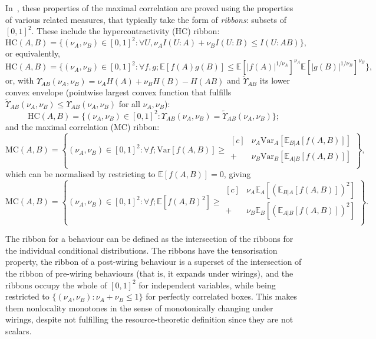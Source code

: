 \documentclass[10pt, a4paper]{article}
\numberwithin{equation}{section} %
\theoremstyle{definition}
\theoremstyle{plain}
\newcommand{\abs}[1]{\left\lvert#1\right\rvert}
\newcommand{\st}{\mathrel{:}} %
\newcommand{\?}{\mathrel{?}} %
\newcommand{\E}{\mathbb{E}} %
\newcommand{\Var}{\mathrm{Var}} %
\newcommand{\HC}{\mathrm{HC}}
\newcommand{\MC}{\mathrm{MC}}
\begin{document}
    In~\cite{NLMonotones}, these properties of the maximal correlation are proved using the properties of various related measures, that typically take the form of \emph{ribbons}: subsets of \({[0,1]}^2\). These include the hypercontractivity (HC) ribbon:
    \begin{equation}
      \HC(A,B) = \{(\nu_A, \nu_B) \in {[0,1]}^2 \st \forall U, \nu_A I(U:A) + \nu_B I(U:B) \leq I(U:AB)\},
    \end{equation}
    or equivalently,
    \begin{equation}
      \HC(A,B) = \{(\nu_A, \nu_B) \in {[0,1]}^2 \st \forall f,g; \E[f(A)g(B)] \leq {\E[\abs{f(A)}^{1/\nu_A}]}^{\nu_A} {\E[\abs{g(B)}^{1/\nu_B}]}^{\nu_B} \},
    \end{equation}
    or, with \(\Upsilon_{AB}(\nu_A, \nu_B) = \nu_A H(A) + \nu_B H(B) - H(AB)\) and \(\tilde{\Upsilon}_{AB}\) its lower convex envelope (pointwise largest convex function that fulfills \(\tilde{\Upsilon}_{AB}(\nu_A, \nu_B) \leq \Upsilon_{AB}(\nu_A, \nu_B)\) for all \(\nu_A, \nu_B\)):
    \begin{equation}
      \HC(A,B) = \{(\nu_A, \nu_B) \in {[0,1]}^2 \st \Upsilon_{AB}(\nu_A, \nu_B) = \tilde{\Upsilon}_{AB}(\nu_A, \nu_B) \};
    \end{equation}
    and the maximal correlation (MC) ribbon:
    \begin{equation}
      \MC(A,B) = \left\{ 
        (\nu_A, \nu_B) \in {[0,1]}^2 \st \forall f; \Var[f(A,B)] \geq 
        \begin{aligned}[c]
          & \nu_A \Var_A[\E_{B|A}[f(A,B)]] \\
          + & \nu_B \Var_B[\E_{A|B}[f(A,B)]] \\
        \end{aligned}
      \right\},
    \end{equation}
    which can be normalised by restricting to \(\E[f(A,B)] = 0\), giving
    \begin{equation}
      \MC(A,B) = \left\{(\nu_A, \nu_B) \in {[0,1]}^2 \st \forall f; \E[{f(A,B)}^2] \geq 
        \begin{aligned}[c]
          & \nu_A \E_A[{(\E_{B|A}[f(A,B)])}^2] \\ + & \nu_B \E_B[{(\E_{A|B}[f(A,B)])}^2] \\
        \end{aligned}
      \right\}.
    \end{equation}

    The ribbon for a behaviour can be defined as the intersection of the ribbons for the individual conditional distributions. The ribbons have the tensorisation property, the ribbon of a post-wiring behaviour is a superset of the intersection of the ribbon of pre-wiring behaviours (that is, it expands under wirings), and the ribbons occupy the whole of \({[0,1]}^2\) for independent variables, while being restricted to \(\{(\nu_A, \nu_B) \st \nu_A + \nu_B \leq 1\}\) for perfectly correlated boxes. This makes them nonlocality monotones in the sense of monotonically changing under wirings, despite not fulfilling the resource-theoretic definition since they are not scalars.
\end{document}
